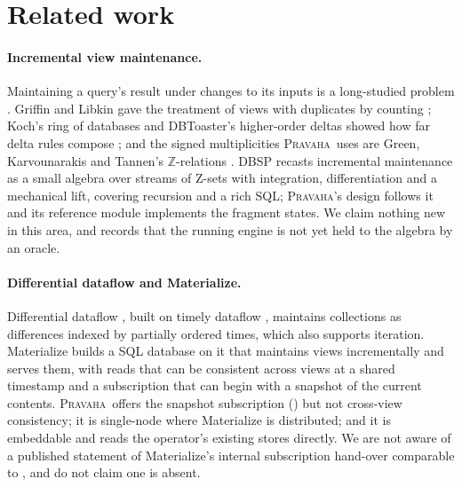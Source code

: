 \documentclass[11pt,a4paper]{article}
\renewcommand{\_}{\oldunderscore\allowbreak}
\newcommand{\Pv}{\textsc{Pravaha}}
\newcommand{\Z}{\mathbb{Z}}
\begin{document}
\section{Related work}\label{sec:related}

\paragraph{Incremental view maintenance.} Maintaining a query's result under changes to its inputs is a
long-studied problem \cite{blakeley1986,gupta1995}. Griffin and Libkin gave the treatment of views with
duplicates by counting \cite{griffin1995}; Koch's ring of databases and DBToaster's higher-order deltas
showed how far delta rules compose \cite{koch2010,dbtoaster2012}; and the signed multiplicities \Pv\ uses
are Green, Karvounarakis and Tannen's $\Z$-relations \cite{green2007,green2009}. DBSP \cite{dbsp2023}
recasts incremental maintenance as a small algebra over streams of Z-sets with integration,
differentiation and a mechanical lift, covering recursion and a rich SQL; \Pv's design follows it and
its reference module implements the fragment  states. We claim nothing new in this area,
and  records that the running engine is not yet held to the algebra by an oracle.

\paragraph{Differential dataflow and Materialize.} Differential dataflow \cite{mcsherry2013}, built on
timely dataflow \cite{naiad2013}, maintains collections as differences indexed by partially ordered
times, which also supports iteration. Materialize \cite{materialize} builds a SQL database on it that
maintains views incrementally and serves them, with reads that can be consistent across views at a
shared timestamp and a subscription that can begin with a snapshot of the current contents. \Pv\ offers
the snapshot subscription () but not cross-view consistency; it is single-node where
Materialize is distributed; and it is embeddable and reads the operator's existing stores directly. We
are not aware of a published statement of Materialize's internal subscription hand-over comparable to
, and do not claim one is absent.
\end{document}
